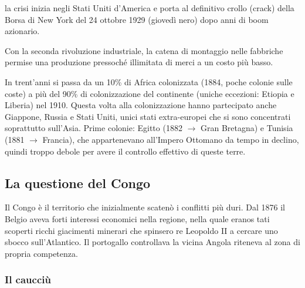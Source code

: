 \documentclass[a4paper]{article}
\begin{document}
la crisi inizia negli Stati Uniti d'America e porta al definitivo crollo
(crack) della Borsa di New York del 24 ottobre 1929 (giovedì nero) dopo anni di boom azionario. 

Con la seconda rivoluzione industriale, la catena di montaggio nelle fabbriche
permise una produzione pressoché illimitata di merci a un costo più basso.

In trent'anni si passa da un 10\% di Africa colonizzata (1884, poche colonie sulle coste)
a più del 90\% di
colonizzazione del continente (uniche eccezioni: Etiopia e Liberia) nel 1910.
Questa volta alla colonizzazione hanno partecipato anche Giappone, Russia e Stati Uniti, unici stati
extra-europei che si sono concentrati soprattutto sull'Asia.
Prime colonie: Egitto (1882 \(\rightarrow\) Gran Bretagna) e Tunisia (1881 \(\rightarrow\) Francia), che appartenevano
all'Impero Ottomano da tempo in declino, quindi troppo debole per avere il controllo effettivo di
queste terre.

\subsection{La questione del Congo}


Il Congo è il territorio che inizialmente scatenò i conflitti più duri.
Dal 1876 il Belgio aveva forti interessi economici nella regione, nella quale
eranos tati scoperti ricchi giacimenti minerari che spinsero re Leopoldo II a cercare
uno sbocco sull'Atlantico. Il portogallo controllava la vicina Angola riteneva al zona di propria competenza.

\subsubsection{Il caucciù}
\end{document}
